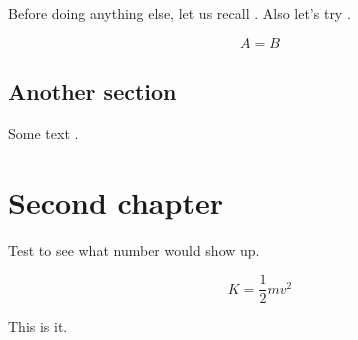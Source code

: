\documentclass[noocg]{wwwnotes2}
\begin{document}
Before doing anything else, let us recall . Also let's try .

\lipsum[2]

\begin{equation}
	A = B
\end{equation}

\lipsum[3-8]



\section{Another section}

\lipsum[5-9]

Some text \cite{Wong2009}.


\chapter{Second chapter}

Test \theequation to see what number would show up.

\lipsum[10-23]

\begin{equation}
K = \frac12 mv^2
\end{equation}

This is it.


\cleardoublepage
\printbibliography[heading=bibintoc]
\end{document}
